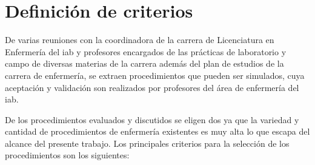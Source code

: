 \section{Definición de criterios}
\label{sec:criterios}

De varias reuniones con la coordinadora de la carrera de Licenciatura
en Enfermería del \Gls{iab} y profesores encargados de las prácticas de
laboratorio y campo de diversas materias de la carrera además 
del plan de estudios de la carrera de enfermería, se extraen procedimientos que
pueden ser simulados, cuya aceptación y validación son realizados por  
profesores del área de enfermería del \Gls{iab}.

De los procedimientos evaluados y discutidos se eligen dos ya que la variedad y
cantidad de procedimientos de enfermería existentes es muy alta lo que escapa
del alcance del presente trabajo. Los principales criterios para la selección de los 
procedimientos son los siguientes:

